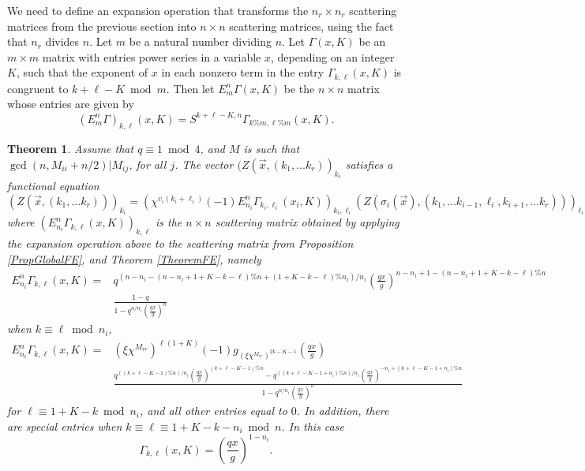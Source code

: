 \documentclass[11pt,letterpaper]{article}
\newtheorem{theorem}{Theorem}[section]
\theoremstyle{definition}
\theoremstyle{remark}
\numberwithin{equation}{section}
\theoremstyle{dotless}
\begin{document}
We need to define an expansion operation that transforms the $n_r \times n_r$ scattering matrices from the previous section into $n\times n$ scattering matrices, using the fact that $n_r$ divides $n$. Let $m$ be a natural number dividing $n$. Let $\Gamma(x,K)$ be an $m\times m$ matrix with entries power series in a variable $x$, depending on an integer $K$, such that the exponent of $x$ in each nonzero term in the entry $\Gamma_{k,\ell} (x,K)$ is congruent to $k + \ell- K \bmod m$. Then let $E_m^n \Gamma(x,K)$ be the $n\times n$ matrix whose entries are given by 
\begin{equation*}
(E_m^n \Gamma)_{k,\ell}(x,K) = S^{k+\ell-K, n} \Gamma_{k \% m, \ell \% m} (x,K).
\end{equation*} 

\begin{theorem}\label{TheoremMultiFE}
Assume that $q \equiv 1 \bmod 4$, and $M$ is such that $\gcd(n, M_{ii}+n/2) | M_{ij}$, for all $j$. The vector $(Z(\vec{x}, (k_1, \ldots k_r))_{k_i}$ satisfies a functional equation 
\begin{equation}\label{eq-TheoremMultiFE}
(Z(\vec{x}, (k_1, \ldots k_r)))_{k_i} = \left( \chi^{v_i (k_i+\ell_i)}(-1) E_{n_i}^n \Gamma_{k_i, \ell_i}(x_i, K) \right)_{k_i, \ell_i} (Z(\sigma_i(\vec{x}), (k_1, \ldots k_{i-1}, \ell_i, k_{i+1}, \ldots k_r)))_{\ell_i}
\end{equation}
where $\left( E_{n_i}^n \Gamma_{k, \ell}(x, K) \right)_{k, \ell}$ is the $n \times n$ scattering matrix obtained by applying the expansion operation above to the scattering matrix from Proposition \ref{PropGlobalFE}, and Theorem \ref{TheoremFE}, namely
\begin{equation*}
\begin{split}
E_{n_i}^n\Gamma_{k,\ell}(x, K) =& q^{(n-n_i-(n-n_i+1+K-k-\ell)\% n+(1+K-k-\ell)\%n_i)/n_i} \left(\frac{qx}{g}\right)^{n-n_i+1 - (n-n_i+1+K-k-\ell)\% n}\\
&\frac{1-q}{1-q^{n/n_i}\left(\frac{q x}{g}\right)^n}
\end{split}
\end{equation*}
when $k \equiv \ell \bmod n_i$,
\begin{equation*}
\begin{split}
E_{n_i}^n\Gamma_{k,\ell}(x, K)=&(\xi \chi^{M_{rr}})^{\ell(1+K)}(-1) g_{(\xi \chi^{M_{rr}})^{2k-K -1}} \left(\frac{qx}{g}\right) \\
&\frac{q^{((k+\ell-K-1)\%n)/n_i}\left(\frac{qx}{g}\right)^{(k+\ell-K-1)\%n}-q^{((k+\ell-K-1+n_i)\%n)/n_i} \left(\frac{qx}{g}\right)^{-n_i+(k+\ell-K-1+n_i)\%n}}{1-q^{n/n_i}\left(\frac{qx}{g}\right)^n} 
\end{split}
\end{equation*}
for $\ell \equiv 1+K -k \bmod n_i$, and all other entries equal to $0$. In addition, there are special entries when $k \equiv \ell \equiv 1+K -k-n_i \bmod n$. In this case 
\begin{equation*}
\Gamma_{k,\ell}(x, K)=\left(\frac{qx}{g}\right)^{1-n_i}.
\end{equation*}
\end{theorem}
\end{document}
